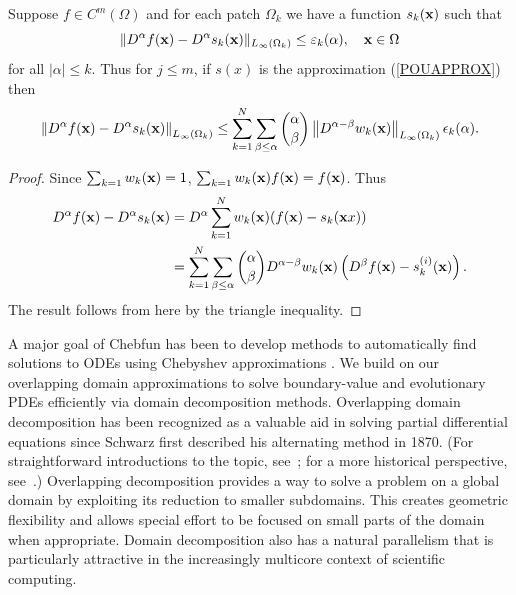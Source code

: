 \begin{thm}
	\label{PUMCON}
	Suppose $f \in C^{m}(\Omega)$ and for each patch $\Omega_k$ we have a function $s_k(\mathbf{x})$ such that
	$$ \|D^{\alpha}f(\mathbf{x})-D^{\alpha} s_k(\mathbf{x})\|_{L_{\infty}(\Omega_k)} \leq \varepsilon_k(\alpha),\quad \mathbf{x} \in \Omega $$
	for all $|\alpha| \leq k$. Thus for $j\leq m$, if $s(x)$ is the approximation (\ref{POUAPPROX}) then
	\begin{equation}
	\left \| D^{\alpha}f(\mathbf{x})-D^{\alpha} s_k(\mathbf{x}) \right \|_{L_{\infty}(\Omega_k)} \leq \sum_{k=1}^N\sum_{\beta \leq \alpha} \binom{\alpha}{\beta} \left \| D^{\alpha-\beta} w_k(\mathbf{x}) \right \|_{L_{\infty}(\Omega_k)} \epsilon_k(\alpha).
	\end{equation}
\end{thm}
\begin{proof}
	Since $\sum_{k=1} w_k(\mathbf{x})=1$, $\sum_{k=1} w_k(\mathbf{x})f(\mathbf{x})=f(\mathbf{x})$. Thus
	\begin{equation}
	\begin{aligned}
	D^{\alpha}f(\mathbf{x})-D^{\alpha} s_k(\mathbf{x}) &= D^{\alpha} \sum_{k=1}^N w_k(\mathbf{x})(f(\mathbf{x})-s_k(\mathbf{x}x)) \\
	&= \sum_{k=1}^N\sum_{\beta \leq \alpha} \binom{\alpha}{\beta} D^{\alpha-\beta} w_k(\mathbf{x}) \left( D^{\beta} f(\mathbf{x})-s_k^{(i)}(\mathbf{x}) \right).
	\end{aligned}
	\end{equation}
	The result follows from here by the triangle inequality.
\end{proof}

A major goal of Chebfun has been to develop methods to automatically find solutions to ODEs using Chebyshev approximations \cite{driscoll2008chebop,birkisson2012automatic,birkisson2013numerical}. We build on our overlapping domain approximations to solve boundary-value and evolutionary PDEs efficiently via domain decomposition methods. Overlapping domain decomposition has been recognized as a valuable aid in solving partial differential equations since Schwarz first described his alternating method in 1870. (For straightforward introductions to the topic, see~\cite{Dolean2015,Smith2004}; for a more historical perspective, see~\cite{Gander2008}.) Overlapping decomposition provides a way to solve a problem on a global domain by exploiting its reduction to smaller subdomains. This creates geometric flexibility and allows special effort to be focused on small parts of the domain when appropriate. Domain decomposition also has a natural parallelism that is particularly attractive in the increasingly multicore context of scientific computing.


